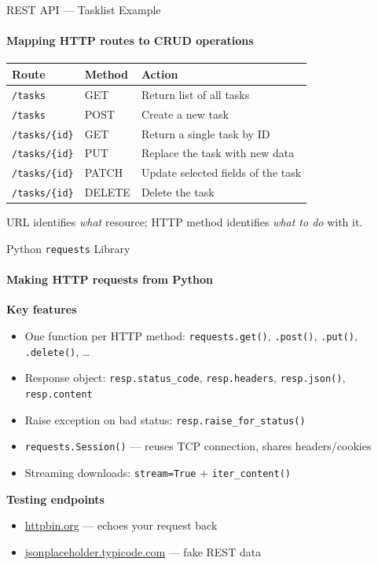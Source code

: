 \documentclass[aspectratio=169]{beamer}
\begin{document}
\begin{frame}[t]{REST API — Tasklist Example}
\framesubtitle{Mapping HTTP routes to CRUD operations}
\vspace{-0.2cm}
\begin{center}
\footnotesize
\begin{tabular}{@{}llp{6cm}@{}}
\toprule
\textbf{Route} & \textbf{Method} & \textbf{Action} \\
\midrule
\texttt{/tasks} & GET & Return list of all tasks \\
\texttt{/tasks} & POST & Create a new task \\
\texttt{/tasks/\{id\}} & GET & Return a single task by ID \\
\texttt{/tasks/\{id\}} & PUT & Replace the task with new data \\
\texttt{/tasks/\{id\}} & PATCH & Update selected fields of the task \\
\texttt{/tasks/\{id\}} & DELETE & Delete the task \\
\bottomrule
\end{tabular}
\end{center}
\vspace{3mm}

{URL identifies \emph{what} resource; HTTP method identifies \emph{what to do} with it.}
\end{frame}

\begin{frame}[t]{Python \texttt{requests} Library}
\framesubtitle{Making HTTP requests from Python}
        \textbf{Key features}
        \begin{itemize}
            \item One function per HTTP method: \texttt{requests.get()}, \texttt{.post()}, \texttt{.put()}, \texttt{.delete()}, \ldots
            \item Response object: \texttt{resp.status\_code}, \texttt{resp.headers}, \texttt{resp.json()}, \texttt{resp.content}
            \item Raise exception on bad status: \texttt{resp.raise\_for\_status()}
            \item \texttt{requests.Session()} — reuses TCP connection, shares headers/cookies
            \item Streaming downloads: \texttt{stream=True} + \texttt{iter\_content()}
        \end{itemize}
        \vspace{2mm}
        \textbf{Testing endpoints}
        \begin{itemize}
            \item \href{https://httpbin.org}{httpbin.org} — echoes your request back
            \item \href{https://jsonplaceholder.typicode.com}{jsonplaceholder.typicode.com} — fake REST data
        \end{itemize}

\end{frame}
\end{document}
